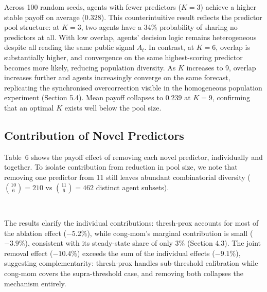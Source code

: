 Across 100 random seeds, agents with fewer predictors ($K=3$) achieve a higher stable payoff on average ($0.328$). This counterintuitive result reflects the predictor pool structure: at $K=3$, two agents have a 34\% probability of sharing no predictors at all. With low overlap, agents' decision logic remains heterogeneous despite all reading the same public signal $A_t$. In contrast, at $K=6$, overlap is substantially higher, and convergence on the same highest-scoring predictor becomes more likely, reducing population diversity. As $K$ increases to 9, overlap increases further and agents increasingly converge on the same forecast, replicating the synchronised overcorrection visible in the homogeneous population experiment (Section 5.4). Mean payoff collapses to $0.239$ at $K=9$, confirming that an optimal $K$ exists well below the pool size. \\

\subsection{Contribution of Novel Predictors}

Table~6 shows the payoff effect of removing each novel predictor, individually and together. To isolate contribution from reduction in pool size, we note that removing one predictor from 11 still leaves abundant combinatorial diversity ($\binom{10}{6} = 210$ vs $\binom{11}{6} = 462$ distinct agent subsets). \\

\begin{table}[H]
\centering
\small
{} \\
\caption{Payoff contribution of novel predictors}
\end{table}

The results clarify the individual contributions: thresh-prox accounts for most of the ablation effect ($-5.2\%$), while cong-mom's marginal contribution is small ($-3.9\%$), consistent with its steady-state share of only 3\% (Section 4.3). The joint removal effect ($-10.4\%$) exceeds the sum of the individual effects ($-9.1\%$), suggesting complementarity: thresh-prox handles sub-threshold calibration while cong-mom covers the supra-threshold case, and removing both collapses the mechanism entirely. \\

